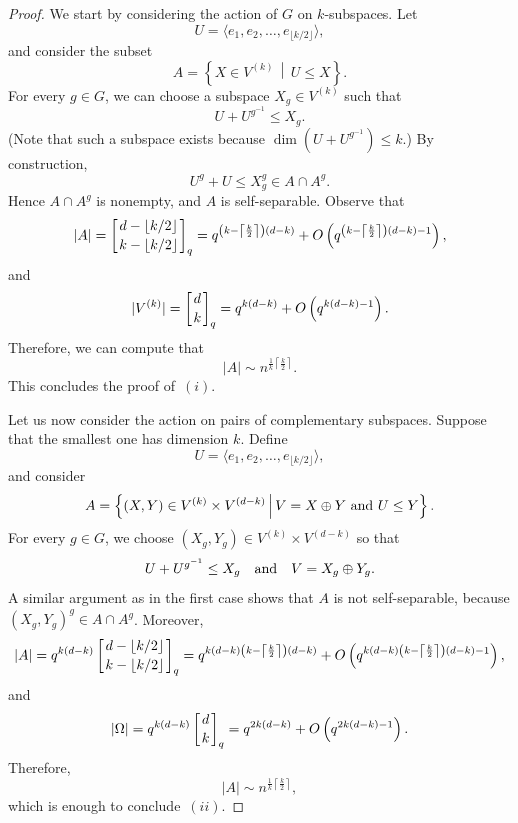 \documentclass[10pt,a4paper]{amsart}
\begin{document}
\begin{proof}
    We start by considering the action of $G$ on $k$-subspaces. Let
    \[U = \langle e_1,e_2,\ldots, e_{\lfloor k/2 \rfloor} \rangle ,\]
    and consider the subset
    $$A = \left\{ X \in V^{(k)} \,\middle\vert\,  U \leq X\right\}.$$
    For every $g\in G$, we can choose a subspace $X_g \in V^{(k)}$ such that
    \[ U + U^{g^{-1}} \leq X_g. \]
    (Note that such a subspace exists because $\dim (U + U^{g^{-1}}) \le k$.)
    By construction,
    \[ U^g + U \le X_g^g \in A \cap A^g .\]
    Hence $A\cap A^g$ is nonempty, and $A$ is self-separable.
    Observe that
    \[|A| = \left[ d-\lfloor k/2\rfloor \atop k-\lfloor k/2\rfloor\right]_q = q^{\left(k - \left\lceil\frac{k}{2}\right\rceil \right)(d-k)} + O\left( q^{\left(k - \left\lceil\frac{k}{2}\right\rceil \right)(d-k) -1}\right) ,\]
    and
    \[|V^{(k)}|=\left[ d \atop k \right]_q = q^{k(d-k)} + O\left( q^{k(d-k) -1}\right). \]
    Therefore, we can compute that
    \[ |A| \sim n^{\frac{1}{k} \left\lceil \frac{k}{2}\right\rceil} .\]
    This concludes the proof of~$(i)$.

    Let us now consider the action on pairs of complementary subspaces. Suppose that the smallest one has dimension $k$. Define
    \[ U = \langle e_1,e_2,\ldots, e_{\lfloor k/2 \rfloor} \rangle ,\]
    and consider
    $$A = \left\{ (X,Y) \in V^{(k)}\times V^{(d-k)} \,\middle\vert\,  V= X \oplus Y \hbox{ and } U \leq Y\right\}.$$
    For every $g\in G$, we choose $(X_g,Y_g) \in V^{(k)}\times V^{(d-k)}$ so that
    \[ U + U^{g^{-1}} \le X_g  \quad \hbox{and}  \quad V= X_g \oplus Y_g .\]
    A similar argument as in the first case shows that $A$ is not self-separable, because $(X_g,Y_g)^g \in A \cap A^g$. Moreover,
    \[|A| = q^{k(d-k)} \left[ d-\lfloor k/2\rfloor \atop k-\lfloor k/2\rfloor\right]_q = q^{k(d-k)\left(k - \left\lceil\frac{k}{2}\right\rceil \right)(d-k)} + O\left( q^{k(d-k)\left(k - \left\lceil\frac{k}{2}\right\rceil \right)(d-k) -1}\right) ,\]
    and
    \[|\Omega| = q^{k(d-k)}\left[ d \atop k \right]_q = q^{2k(d-k)} + O\left( q^{2k(d-k) -1}\right). \]
    Therefore,
    \[ |A| \sim n^{\frac{1}{k} \left\lceil \frac{k}{2}\right\rceil} ,\]
    which is enough to conclude~$(ii)$.


\end{proof}
\end{document}
